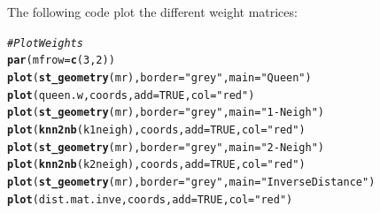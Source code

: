 \documentclass[english,12pt]{book}\usepackage[]{graphicx}\usepackage[]{xcolor}
\makeatletter
\newcommand{\hlnum}[1]{\textcolor[rgb]{0.686,0.059,0.569}{#1}}%
\newcommand{\hlstr}[1]{\textcolor[rgb]{0.192,0.494,0.8}{#1}}%
\newcommand{\hlcom}[1]{\textcolor[rgb]{0.678,0.584,0.686}{\textit{#1}}}%
\newcommand{\hlstd}[1]{\textcolor[rgb]{0.345,0.345,0.345}{#1}}%
\newcommand{\hlkwc}[1]{\textcolor[rgb]{0.333,0.667,0.333}{#1}}%
\newcommand{\hlkwd}[1]{\textcolor[rgb]{0.737,0.353,0.396}{\textbf{#1}}}%
\newenvironment{kframe}{%
 \def\at@end@of@kframe{}%
 \ifinner\ifhmode%
  \def\at@end@of@kframe{\end{minipage}}%
  \begin{minipage}{\columnwidth}%
 \fi\fi%
 \def\FrameCommand##1{\hskip\@totalleftmargin \hskip-\fboxsep
 \colorbox{shadecolor}{##1}\hskip-\fboxsep
     \hskip-\linewidth \hskip-\@totalleftmargin \hskip\columnwidth}%
 \MakeFramed {\advance\hsize-\width
   \@totalleftmargin\z@ \linewidth\hsize
   \@setminipage}}%
 {\par\unskip\endMakeFramed%
 \at@end@of@kframe}
\newenvironment{knitrout}{}{} %
\makeatother
\begin{document}



The following code plot the different weight matrices: 


\begin{knitrout}
\color{fgcolor}\begin{kframe}
\begin{alltt}
\hlcom{# Plot Weights}
\hlkwd{par}\hlstd{(}\hlkwc{mfrow} \hlstd{=} \hlkwd{c}\hlstd{(}\hlnum{3}\hlstd{,} \hlnum{2}\hlstd{))}
\hlkwd{plot}\hlstd{(}\hlkwd{st_geometry}\hlstd{(mr),} \hlkwc{border} \hlstd{=} \hlstr{"grey"}\hlstd{,} \hlkwc{main} \hlstd{=} \hlstr{"Queen"}\hlstd{)}
\hlkwd{plot}\hlstd{(queen.w, coords,} \hlkwc{add} \hlstd{=}  \hlnum{TRUE}\hlstd{,} \hlkwc{col} \hlstd{=} \hlstr{"red"}\hlstd{)}
\hlkwd{plot}\hlstd{(}\hlkwd{st_geometry}\hlstd{(mr),} \hlkwc{border} \hlstd{=} \hlstr{"grey"}\hlstd{,} \hlkwc{main} \hlstd{=} \hlstr{"1-Neigh"}\hlstd{)}
\hlkwd{plot}\hlstd{(}\hlkwd{knn2nb}\hlstd{(k1neigh), coords,} \hlkwc{add} \hlstd{=} \hlnum{TRUE}\hlstd{,} \hlkwc{col} \hlstd{=} \hlstr{"red"}\hlstd{)}
\hlkwd{plot}\hlstd{(}\hlkwd{st_geometry}\hlstd{(mr),} \hlkwc{border} \hlstd{=} \hlstr{"grey"}\hlstd{,} \hlkwc{main} \hlstd{=} \hlstr{"2-Neigh"}\hlstd{)}
\hlkwd{plot}\hlstd{(}\hlkwd{knn2nb}\hlstd{(k2neigh), coords,} \hlkwc{add} \hlstd{=} \hlnum{TRUE}\hlstd{,} \hlkwc{col} \hlstd{=} \hlstr{"red"}\hlstd{)}
\hlkwd{plot}\hlstd{(}\hlkwd{st_geometry}\hlstd{(mr),} \hlkwc{border} \hlstd{=} \hlstr{"grey"}\hlstd{,} \hlkwc{main} \hlstd{=} \hlstr{"Inverse Distance"}\hlstd{)}
\hlkwd{plot}\hlstd{(dist.mat.inve, coords,} \hlkwc{add} \hlstd{=}  \hlnum{TRUE}\hlstd{,} \hlkwc{col} \hlstd{=} \hlstr{"red"}\hlstd{)}
\end{alltt}
\end{kframe}
\end{knitrout}
\end{document}
